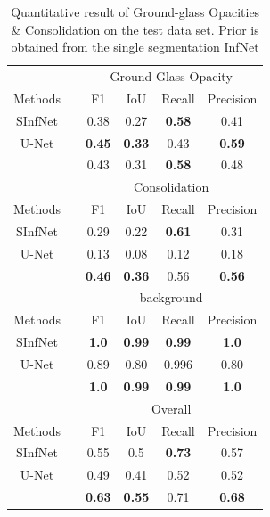 
\begin{table}[!h]
	\centering
	
	\begin{tabular}{| c | c ||  c c c c |}
		\hline
		& &\multicolumn{4}{c|}{Ground-Glass Opacity }\\ \cline{3-6}
		Methods & & F1 & IoU & Recall & Precision \\\hline
		SInfNet &  & 0.38 & 0.27 & \textbf{0.58} & 0.41 \\ \hline
		U-Net & & \textbf{0.45} & \textbf{0.33} & 0.43 & \textbf{0.59} \\ \hline \hline
		\textcolor{blue}{\vtop{\hbox{\strut SSInfNet}\hbox{\strut }}} &  & 0.43 & 0.31 & \textbf{0.58} & 0.48  \\ \hline \hline \hline
		
		
		& & \multicolumn{4}{c|}{Consolidation}\\ \cline{3-6}
		Methods & & F1 & IoU & Recall & Precision \\ \hline 
		SInfNet &  & 0.29 & 0.22 & \textbf{0.61} & 0.31  \\ \hline
		U-Net & & 0.13 & 0.08 & 0.12 & 0.18 \\ \hline \hline
		\textcolor{blue}{\vtop{\hbox{\strut SSInfNet}\hbox{\strut }}} &  & \textbf{0.46} & \textbf{0.36} & 0.56 & \textbf{0.56} \\ \hline \hline \hline
		
		
		& & \multicolumn{4}{c|}{background}\\ \cline{3-6}
		Methods & & F1 & IoU & Recall & Precision \\ \hline 
		SInfNet &  & \textbf{1.0} & \textbf{0.99}  & \textbf{0.99} & \textbf{1.0} \\ \hline
		U-Net & & 0.89 & 0.80 & 0.996 & 0.80 \\ \hline \hline
		\textcolor{blue}{\vtop{\hbox{\strut SSInfNet}\hbox{\strut }}} &  &  \textbf{1.0} & \textbf{0.99} & \textbf{0.99} & \textbf{1.0} \\ \hline \hline \hline
		
		
		& &\multicolumn{4}{c|}{Overall}\\ \cline{3-6}
		Methods & & F1 & IoU & Recall & Precision \\\hline
		SInfNet &  & 0.55 & 0.5 & \textbf{0.73} & 0.57   \\ \hline
		U-Net & & 0.49 & 0.41 & 0.52 & 0.52 \\ \hline \hline
		\textcolor{blue}{\vtop{\hbox{\strut SSInfNet}\hbox{\strut }}} &  & \textbf{0.63} & \textbf{0.55} & 0.71 & \textbf{0.68}  \\ \hline
		
		
	\end{tabular}
	\caption{Quantitative result of Ground-glass Opacities \& Consolidation on the test data set. Prior is obtained from the single segmentation InfNet}
	\label{tab:multi-weakprior}
\end{table}


